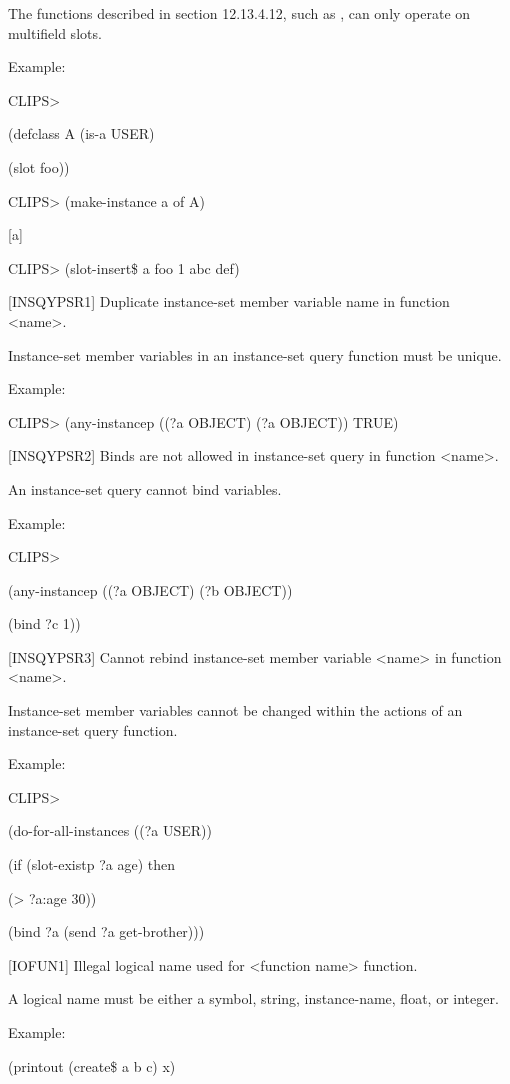 \documentclass[letterpaper,10pt,english]{sphinxmanual}
\begin{document}
The functions described in section 12.13.4.12, such as ,
can only operate on multifield slots.

Example:

CLIPS\textgreater{}

(defclass A (is-a USER)

(slot foo))

CLIPS\textgreater{} (make-instance a of A)

{[}a{]}

CLIPS\textgreater{} (slot-insert\$ a foo 1 abc def)

{[}INSQYPSR1{]} Duplicate instance-set member variable name in function
\textless{}name\textgreater{}.

Instance-set member variables in an instance-set query function must be
unique.

Example:

CLIPS\textgreater{} (any-instancep ((?a OBJECT) (?a OBJECT)) TRUE)

{[}INSQYPSR2{]} Binds are not allowed in instance-set query in function
\textless{}name\textgreater{}.

An instance-set query cannot bind variables.

Example:

CLIPS\textgreater{}

(any-instancep ((?a OBJECT) (?b OBJECT))

(bind ?c 1))

{[}INSQYPSR3{]} Cannot rebind instance-set member variable \textless{}name\textgreater{} in
function \textless{}name\textgreater{}.

Instance-set member variables cannot be changed within the actions of an
instance-set query function.

Example:

CLIPS\textgreater{}

(do-for-all-instances ((?a USER))

(if (slot-existp ?a age) then

(\textgreater{} ?a:age 30))

(bind ?a (send ?a get-brother)))

{[}IOFUN1{]} Illegal logical name used for \textless{}function name\textgreater{} function.

A logical name must be either a symbol, string, instance-name, float, or
integer.

Example:

(printout (create\$ a b c) x)
\end{document}
